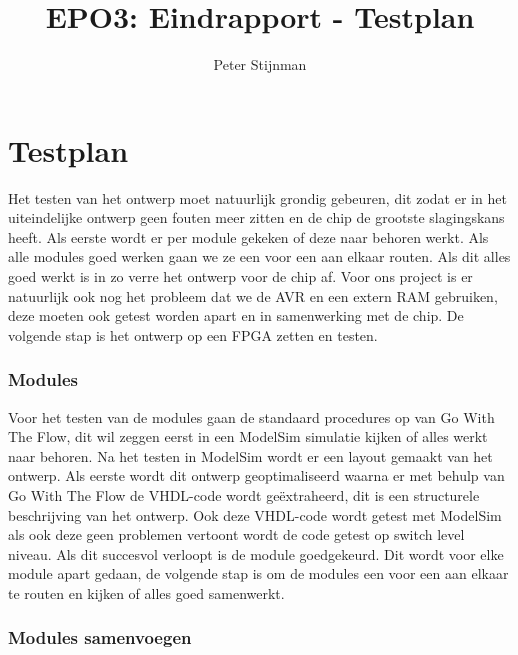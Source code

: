 \documentclass{scrartcl} %
\author{Peter Stijnman}
\title{EPO3: Eindrapport - Testplan}
\begin{document}
\chapter{Testplan}
\label{ch:testplan}


Het testen van het ontwerp moet natuurlijk grondig gebeuren, dit zodat er in het uiteindelijke ontwerp geen fouten meer zitten en de chip de grootste slagingskans heeft. 
Als eerste wordt er per module gekeken of deze naar behoren werkt. Als alle modules goed werken gaan we ze een voor een aan elkaar routen. Als dit alles goed werkt is in zo verre het ontwerp voor de chip af.
Voor ons project is er natuurlijk ook nog het probleem dat we de AVR en een extern RAM gebruiken, deze moeten ook getest worden apart en in samenwerking met de chip.
De volgende stap is  het ontwerp op een FPGA zetten en testen.

\subsection{Modules}

Voor het testen van de modules gaan de standaard procedures op van Go With The Flow, dit wil zeggen eerst in een ModelSim simulatie kijken of alles werkt naar behoren. 
Na het testen in ModelSim wordt er een layout gemaakt van het ontwerp. Als eerste wordt dit ontwerp geoptimaliseerd waarna er met behulp van Go With The Flow de VHDL-code wordt geëxtraheerd,
dit is een structurele beschrijving van het ontwerp. Ook deze VHDL-code wordt getest met ModelSim als ook deze geen problemen vertoont wordt de code getest op switch level niveau. Als dit succesvol verloopt is de module goedgekeurd.
Dit wordt voor elke module apart gedaan, de volgende stap is om de modules een voor een aan elkaar te routen en kijken of alles goed samenwerkt.



\subsection{Modules samenvoegen}
\end{document}
